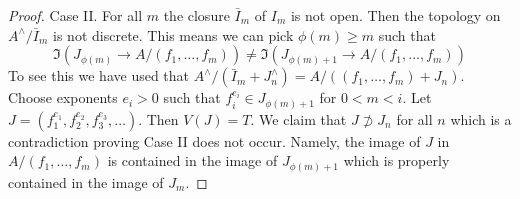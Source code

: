 \begin{proof}
\medskip\noindent
Case II. For all $m$ the closure $\bar I_m$ of $I_m$ is not open.
Then the topology on $A^\wedge/\bar I_m$ is not discrete. This means
we can pick $\phi(m) \geq m$ such that
$$
\Im(J_{\phi(m)} \to A/(f_1, \ldots, f_m)) \not =
\Im(J_{\phi(m) + 1} \to A/(f_1, \ldots, f_m))
$$
To see this we have used that
$A^\wedge/(\bar I_m + J_n^\wedge) = A/((f_1, \ldots, f_m) + J_n)$.
Choose exponents $e_i > 0$ such that $f_i^{e_i} \in J_{\phi(m) + 1}$
for $0 < m < i$. Let $J = (f_1^{e_1}, f_2^{e_2}, f_3^{e_3}, \ldots)$.
Then $V(J) = T$. We claim that $J \not \supset J_n$ for all $n$
which is a contradiction proving Case II does not occur.
Namely, the image of $J$ in $A/(f_1, \ldots, f_m)$ is contained
in the image of $J_{\phi(m) + 1}$ which is properly contained in the
image of $J_m$.
\end{proof}